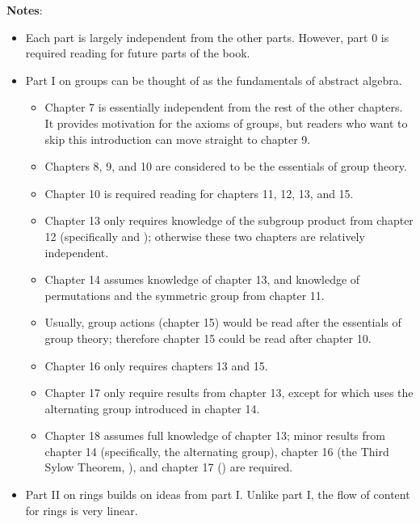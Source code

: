 \newpage
\begin{center}
\end{center}

\newpage

\textbf{Notes}:
\begin{itemize}
    \item Each part is largely independent from the other parts. However, part 0 is required reading for future parts of the book.
    \item Part I on groups can be thought of as the fundamentals of abstract algebra.
    \begin{itemize}
        \item Chapter 7 is essentially independent from the rest of the other chapters. It provides motivation for the axioms of groups, but readers who want to skip this introduction can move straight to chapter 9.
        \item Chapters 8, 9, and 10 are considered to be the essentials of group theory.
        \item Chapter 10 is required reading for chapters 11, 12, 13, and 15.
        \item Chapter 13 only requires knowledge of the subgroup product from chapter 12 (specifically  and ); otherwise these two chapters are relatively independent.
        \item Chapter 14 assumes knowledge of chapter 13, and knowledge of permutations and the symmetric group from chapter 11.
        \item Usually, group actions (chapter 15) would be read after the essentials of group theory; therefore chapter 15 could be read after chapter 10.
        \item Chapter 16 only requires chapters 13 and 15.
        \item Chapter 17 only require results from chapter 13, except for  which uses the alternating group introduced in chapter 14.
        \item Chapter 18 assumes full knowledge of chapter 13; minor results from chapter 14 (specifically, the alternating group), chapter 16 (the Third Sylow Theorem, ), and chapter 17 () are required.
    \end{itemize}
    \item Part II on rings builds on ideas from part I. Unlike part I, the flow of content for rings is very linear.

\end{itemize}
